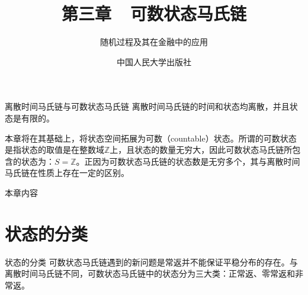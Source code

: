 \documentclass[t]{beamer}
\begin{document}
\fontsize{11}{18}\selectfont


\CTEXindent



  \title{第三章~~可数状态马氏链}
\author{随机过程及其在金融中的应用}
\date{中国人民大学出版社}
  \begin{frame}
    \maketitle
  \end{frame}

  \begin{frame}{离散时间马氏链与可数状态马氏链}
    离散时间马氏链的时间和状态均离散，并且状态是有限的。
    
    本章将在其基础上，将状态空间拓展为可数（countable）状态。所谓的可数状态是指状态的取值是在整数域$\mathbb{Z}$上，且状态的数量无穷大，因此可数状态马氏链所包含的状态为：$S=\mathbb{Z}$。正因为可数状态马氏链的状态数是无穷多个，其与离散时间马氏链在性质上存在一定的区别。
  \end{frame}

\begin{frame}{本章内容}
    \tableofcontents
\end{frame}

\section{状态的分类}
\begin{frame}{状态的分类}
    可数状态马氏链遇到的新问题是常返并不能保证平稳分布的存在。与离散时间马氏链不同，可数状态马氏链中的状态分为三大类：正常返、零常返和非常返。
\end{frame}
\end{document}
